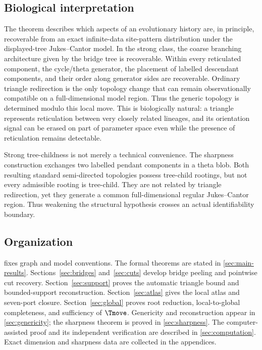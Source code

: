 \subsection{Biological interpretation}

The theorem describes which aspects of an evolutionary history are, in principle, recoverable from an exact infinite-data site-pattern distribution under the displayed-tree Jukes--Cantor model.  In the strong class, the coarse branching architecture given by the bridge tree is recoverable.  Within every reticulated component, the cycle/theta generator, the placement of labelled descendant components, and their order along generator sides are recoverable.  Ordinary triangle redirection is the only topology change that can remain observationally compatible on a full-dimensional model region.  Thus the generic topology is determined modulo this local move.  This is biologically natural: a triangle represents reticulation between very closely related lineages, and its orientation signal can be erased on part of parameter space even while the presence of reticulation remains detectable.

Strong tree-childness is not merely a technical convenience.  The sharpness construction exchanges two labelled pendant components in a theta blob.  Both resulting standard semi-directed topologies possess tree-child rootings, but not every admissible rooting is tree-child.  They are not related by triangle redirection, yet they generate a common full-dimensional regular Jukes--Cantor region.  Thus weakening the structural hypothesis crosses an actual identifiability boundary.

\subsection{Organization}

 fixes graph and model conventions.  The formal theorems are stated in \cref{sec:main-results}.  Sections~\ref{sec:bridges} and~\ref{sec:cuts} develop bridge peeling and pointwise cut recovery.  Section~\ref{sec:support} proves the automatic triangle bound and bounded-support reconstruction.  Section~\ref{sec:atlas} gives the local atlas and seven-port closure.  Section~\ref{sec:global} proves root reduction, local-to-global completeness, and sufficiency of $\Tmove$.  Genericity and reconstruction appear in \cref{sec:genericity}; the sharpness theorem is proved in \cref{sec:sharpness}.  The computer-assisted proof and its independent verification are described in \cref{sec:computation}.  Exact dimension and sharpness data are collected in the appendices.
